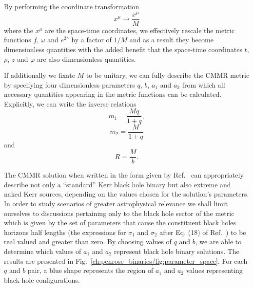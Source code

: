 By performing the coordinate transformation
%
\begin{equation}
  x^{\mu} \rightarrow \frac{x^\mu}{M}
  \label{ch:penrose_binaries/eq:coord_transf_dimensionless}
\end{equation}
%
where the $x^\mu$ are the space-time coordinates, we effectively rescale the metric functions $f$, $\omega$ and $e^{2\gamma}$ by a factor of $1/M$ and as a result they become dimensionless quantities with the added benefit that the space-time coordinates $t$, $\rho$, $z$ and $\varphi$ are also dimensionless quantities.

If additionally we fixate $M$ to be unitary, we can fully describe the CMMR metric by specifying four dimensionless parameters $q$, $b$, $a_1$ and $a_2$ from which all necessary quantities appearing in the metric functions can be calculated. Explicitly, we can write the inverse relations
%
\begin{equation}
  m_1 = \frac{Mq}{1+q},
  \label{ch:penrose_binaries/eq:m1_from_q}
\end{equation}
%
\begin{equation}
  m_2 = \frac{M}{1+q}
  \label{ch:penrose_binaries/eq:m2_from_q}
\end{equation}
%
and
\begin{equation}
  R = \frac{M}{b}.
  \label{ch:penrose_binaries/eq:r_from_b}
\end{equation}

The CMMR solution when written in the form given by Ref.~\cite{MANKO2020} can appropriately describe not only a ``standard'' Kerr black hole binary but also extreme and naked Kerr sources, depending on the values chosen for the solution's parameters. In order to study scenarios of greater astrophysical relevance we shall limit ourselves to discussions pertaining only to the black hole sector of the metric which is given by the set of parameters that cause the constituent black holes horizons half lengths (the expressions for $\sigma_1$ and $\sigma_2$ after Eq. (18) of Ref.~\cite{MANKO2020}) to be real valued and greater than zero. By choosing values of $q$ and $b$, we are able to determine which values of $a_1$ and $a_2$ represent black hole binary solutions. The results are presented in Fig.~\ref{ch:penrose_binaries/fig:parameter_space}. For each $q$ and $b$ pair, a blue shape represents the region of $a_1$ and $a_2$ values representing black hole configurations.

